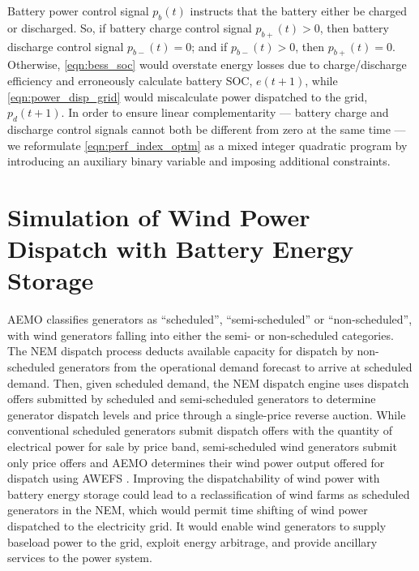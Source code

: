 \documentclass[3p,times,procedia]{elsarticle}
\begin{document}
Battery power control signal $p_{b}(t)$ instructs that the battery either be charged or discharged.  So, if battery charge control signal ${p_{b+}(t)>0}$, then battery discharge control signal ${p_{b-}(t)=0}$; and if ${p_{b-}(t)>0}$, then ${p_{b+}(t)=0}$.  Otherwise, \eqref{eqn:bess_soc} would overstate energy losses due to charge/discharge efficiency and erroneously calculate battery SOC, ${e(t\!+\!1)}$, while \eqref{eqn:power_disp_grid} would miscalculate power dispatched to the grid, ${p_{d}(t\!+\!1)}$.  In order to ensure linear complementarity --- battery charge and discharge control signals cannot both be different from zero at the same time --- we reformulate \eqref{eqn:perf_index_optm} as a mixed integer quadratic program by introducing an auxiliary binary variable and imposing additional constraints.

\section{Simulation of Wind Power Dispatch with Battery Energy Storage}\label{sect:sim_disp_wind_power_bess}
AEMO classifies generators as ``scheduled'', ``semi-scheduled'' or ``non-scheduled'', with wind generators falling into either the semi- or non-scheduled categories.  The NEM dispatch process deducts available capacity for dispatch by non-scheduled generators from the operational demand forecast to arrive at scheduled demand.  Then, given scheduled demand, the NEM dispatch engine uses dispatch offers submitted by scheduled and semi-scheduled generators to determine generator dispatch levels and price through a single-price reverse auction.  While conventional scheduled generators submit dispatch offers with the quantity of electrical power for sale by price band, semi-scheduled wind generators submit only price offers and AEMO determines their wind power output offered for dispatch using AWEFS \cite{AEMO16b}.  Improving the dispatchability of wind power with battery energy storage could lead to a reclassification of wind farms as scheduled generators in the NEM, which would permit time shifting of wind power dispatched to the electricity grid.  It would enable wind generators to supply baseload power to the grid, exploit energy arbitrage, and provide ancillary services to the power system.
\end{document}
